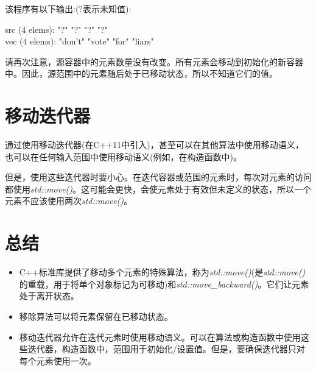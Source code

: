 该程序有以下输出:(?表示未知值):\par

\begin{myOutput}
src (4 elems): "?" "?" "?" "?" \\
vec (4 elems): "don't" "vote" "for" "liars"
\end{myOutput}

请再次注意，源容器中的元素数量没有改变。所有元素会移动到初始化的新容器中。因此，源范围中的元素随后处于已移动状态，所以不知道它们的值。\par


\section{移动迭代器}

通过使用移动迭代器(在C++11中引入)，甚至可以在其他算法中使用移动语义，也可以在任何输入范围中使用移动语义(例如，在构造函数中)。\par

但是，使用这些迭代器时要小心。在迭代容器或范围的元素时，每次对元素的访问都使用\textit{std::move()}。这可能会更快，会使元素处于有效但未定义的状态，所以一个元素不应该使用两次\textit{std::move()}。\par


\section{总结}

\begin{itemize}
  \item C++标准库提供了移动多个元素的特殊算法，称为\textit{std::move()}(是\textit{std::move()}的重载，用于将单个对象标记为可移动)和\textit{std::\allowbreak{}move\_\allowbreak{}backward(\allowbreak{})\allowbreak{}}。它们让元素处于离开状态。
  \item 移除算法可以将元素保留在已移动状态。
  \item 移动迭代器允许在迭代元素时使用移动语义。可以在算法或构造函数中使用这些迭代器，构造函数中，范围用于初始化/设置值。但是，要确保迭代器只对每个元素使用一次。
\end{itemize}
